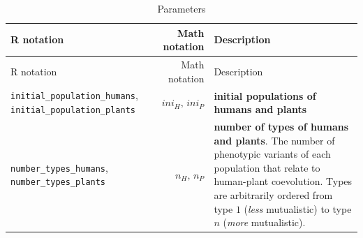 \documentclass[
]{book}
\begin{document}
\begin{longtable}[]{@{}lrl@{}}
\caption{Parameters}\tabularnewline
\toprule
\begin{minipage}[b]{0.27\columnwidth}\raggedright
R notation\strut
\end{minipage} & \begin{minipage}[b]{0.25\columnwidth}\raggedleft
Math notation\strut
\end{minipage} & \begin{minipage}[b]{0.39\columnwidth}\raggedright
Description\strut
\end{minipage}\tabularnewline
\midrule
\endfirsthead
\toprule
\begin{minipage}[b]{0.27\columnwidth}\raggedright
R notation\strut
\end{minipage} & \begin{minipage}[b]{0.25\columnwidth}\raggedleft
Math notation\strut
\end{minipage} & \begin{minipage}[b]{0.39\columnwidth}\raggedright
Description\strut
\end{minipage}\tabularnewline
\midrule
\endhead
\begin{minipage}[t]{0.27\columnwidth}\raggedright
\texttt{initial\_population\_humans}, \texttt{initial\_population\_plants}\strut
\end{minipage} & \begin{minipage}[t]{0.25\columnwidth}\raggedleft
\(ini_{H},\,ini_{P}\)\strut
\end{minipage} & \begin{minipage}[t]{0.39\columnwidth}\raggedright
\textbf{initial populations of humans and plants}\strut
\end{minipage}\tabularnewline
\begin{minipage}[t]{0.27\columnwidth}\raggedright
\texttt{number\_types\_humans}, \texttt{number\_types\_plants}\strut
\end{minipage} & \begin{minipage}[t]{0.25\columnwidth}\raggedleft
\(n_{H},\,n_{P}\)\strut
\end{minipage} & \begin{minipage}[t]{0.39\columnwidth}\raggedright
\textbf{number of types of humans and plants}. The number of phenotypic variants of each population that relate to human-plant coevolution. Types are arbitrarily ordered from type \(1\) (\emph{less} mutualistic) to type \(n\) (\emph{more} mutualistic).\strut
\end{minipage}\tabularnewline

\end{longtable}
\end{document}
